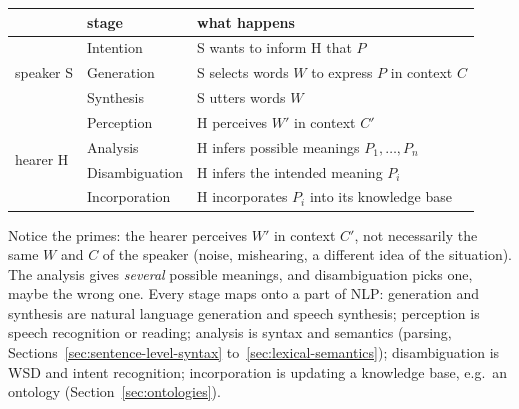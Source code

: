 \begin{center}
\small
\begin{tabular}{@{}l l l@{}}
\toprule
 & \textbf{stage} & \textbf{what happens} \\
\midrule
\multirow{3}{*}{\textcolor{nbblue}{speaker S}}
  & Intention & S wants to inform H that $P$ \\
  & Generation & S selects words $W$ to express $P$ in context $C$ \\
  & Synthesis & S utters words $W$ \\
\midrule
\multirow{4}{*}{\textcolor{nbblue}{hearer H}}
  & Perception & H perceives $W'$ in context $C'$ \\
  & Analysis & H infers possible meanings $P_1, \ldots, P_n$ \\
  & Disambiguation & H infers the intended meaning $P_i$ \\
  & Incorporation & H incorporates $P_i$ into its knowledge base \\
\bottomrule
\end{tabular}
\label{tab:communication-stages}
\end{center}

\begin{nbintuition}
Notice the primes: the hearer perceives $W'$ in context $C'$, not necessarily the same
$W$ and $C$ of the speaker (noise, mishearing, a different idea of the situation). The
analysis gives \emph{several} possible meanings, and disambiguation picks one, maybe the
wrong one. Every stage maps onto a part of NLP: generation and synthesis are natural
language generation and speech synthesis; perception is speech recognition or reading;
analysis is syntax and semantics (parsing, Sections~\ref{sec:sentence-level-syntax}
to~\ref{sec:lexical-semantics}); disambiguation is WSD and intent recognition;
incorporation is updating a knowledge base, e.g.\ an ontology
(Section~\ref{sec:ontologies}).
\end{nbintuition}
